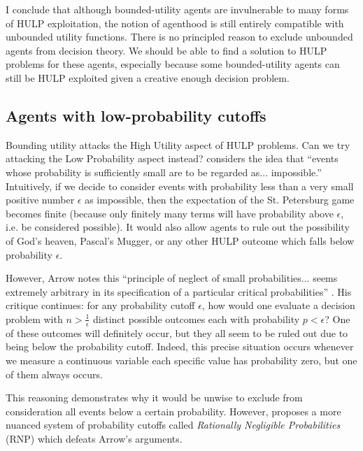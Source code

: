 \documentclass{article}
\begin{document}
I conclude that although bounded-utility agents are invulnerable to many forms of HULP exploitation, the notion of agenthood is still entirely compatible with unbounded utility functions. There is no principled reason to exclude unbounded agents from decision theory. We should be able to find a solution to HULP problems for these agents, especially because some bounded-utility agents can still be HULP exploited given a creative enough decision problem.

\subsection{Agents with low-probability cutoffs}

Bounding utility attacks the High Utility aspect of HULP problems. Can we try attacking the Low Probability aspect instead? \citep[pg. 414]{arrow1951alternative} considers the idea that ``events whose probability is sufficiently small are to be regarded as... impossible.'' Intuitively, if we decide to consider events with probability less than a very small positive number \(\epsilon\) as impossible, then the expectation of the St. Petersburg game becomes finite (because only finitely many terms will have probability above \(\epsilon\), i.e. be considered possible). It would also allow agents to rule out the possibility of God's heaven, Pascal's Mugger, or any other HULP outcome which falls below probability \(\epsilon\).

However, Arrow notes this ``principle of neglect of small probabilities... seems extremely arbitrary in its specification of a particular critical probabilities'' \citep[pg. 414]{arrow1951alternative}. His critique continues: for any probability cutoff \(\epsilon\), how would one evaluate a decision problem with \(n > \frac{1}{\epsilon}\) distinct possible outcomes each with probability \(p < \epsilon\)? One of these outcomes will definitely occur, but they all seem to be ruled out due to being below the probability cutoff. Indeed, this precise situation occurs whenever we measure a continuous variable \textemdash{} each specific value has probability zero, but one of them always occurs.

This reasoning demonstrates why it would be unwise to exclude from consideration all events below a certain probability. However, \citep{smith2014evaluative} proposes a more nuanced system of probability cutoffs called \textit{Rationally Negligible Probabilities} (RNP) which defeats Arrow's arguments.
\end{document}
